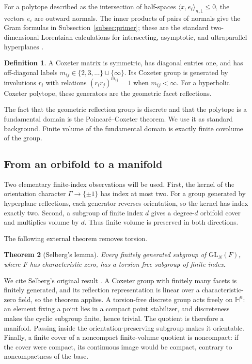 \documentclass[11pt]{article}
\numberwithin{equation}{section}
\newtheorem{theorem}{Theorem}[section]
\theoremstyle{definition}
\newtheorem{definition}[theorem]{Definition}
\theoremstyle{remark}
\newcommand{\HH}{\mathbb{H}}
\begin{document}
For a polytope described as the intersection of half-spaces
\(\langle x,e_i\rangle_{n,1}\le0\), the vectors \(e_i\) are outward normals.
The inner products of pairs of normals give the Gram formulas in
Subsection~\ref{subsec:primer}; these are the standard two-dimensional
Lorentzian calculations for intersecting, asymptotic, and ultraparallel
hyperplanes \cite[Chapter~3]{Ratcliffe}.

\begin{definition}
A Coxeter matrix is symmetric, has diagonal entries one, and has off-diagonal labels
\(m_{ij}\in\{2,3,\ldots\}\cup\{\infty\}\).  Its Coxeter group is generated
by involutions \(r_i\) with relations \((r_ir_j)^{m_{ij}}=1\) when
\(m_{ij}<\infty\).  For a hyperbolic Coxeter polytope, these generators are
the geometric facet reflections.
\end{definition}

The fact that the geometric reflection group is discrete and that the
polytope is a fundamental domain is the Poincar\'e--Coxeter theorem.  We use
it as standard background.  Finite volume of the fundamental domain is
exactly finite covolume of the group.

\subsection{From an orbifold to a manifold}
\label{subsec:orbifold-manifold}

Two elementary finite-index observations will be used.  First, the kernel of
the orientation character \(\Gamma\to\{\pm1\}\) has index at most two.
For a group generated by hyperplane reflections, each generator reverses
orientation, so the kernel has index exactly two.  Second, a subgroup of
finite index \(d\) gives a degree-\(d\) orbifold cover and multiplies volume
by \(d\).  Thus finite volume is preserved in both directions.

The following external theorem removes torsion.

\begin{theorem}[Selberg's lemma]
\label{thm:selberg}
Every finitely generated subgroup of \(\mathrm{GL}_N(F)\), where \(F\) has
characteristic zero, has a torsion-free subgroup of finite index.
\end{theorem}

We cite Selberg's original result \cite{Selberg}.  A Coxeter group with
finitely many facets is finitely generated, and its reflection
representation is linear over a characteristic-zero field, so the theorem
applies.  A torsion-free discrete group acts freely on \(\HH^n\): an element
fixing a point lies in a compact point stabilizer, and discreteness makes the
cyclic subgroup finite, hence trivial.  The quotient is therefore a
manifold.  Passing inside the orientation-preserving subgroup makes it
orientable.  Finally, a finite cover of a noncompact finite-volume quotient
is noncompact: if the cover were compact, its continuous image would be
compact, contrary to noncompactness of the base.
\end{document}
